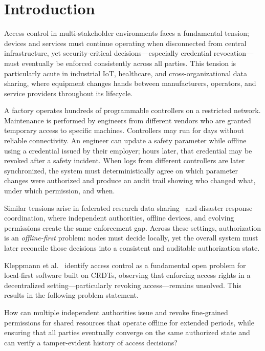 \documentclass[10pt,journal,compsoc]{IEEEtran}
\begin{document}
  
  \section{Introduction}
  \label{sec:intro-paperC}
  Access control in multi-stakeholder environments faces a fundamental tension; devices and services must continue operating when disconnected from central infrastructure, yet security-critical decisions---especially credential revocation---must eventually be enforced consistently across all parties. This tension is particularly acute in industrial IoT\cite{MISTRY2020106382,liu2020fabriciot}, healthcare\cite{HASSELGREN2020104040}, and cross-organizational data sharing\cite{10.1145/3511899,DU2024101878}, where equipment changes hands between manufacturers, operators, and service providers throughout its lifecycle.

  A factory operates hundreds of programmable controllers on a restricted network. Maintenance is performed by engineers from different vendors who are granted temporary access to specific machines. Controllers may run for days without reliable connectivity\cite{9551736,s23208535}. An engineer can update a safety parameter while offline using a credential issued by their employer; hours later, that credential may be revoked after a safety incident. When logs from different controllers are later synchronized, the system must deterministically agree on which parameter changes were authorized and produce an audit trail showing who changed what, under which permission, and when.

  Similar tensions arise in federated research data sharing~\cite{HASSELGREN2020104040,10.1145/3511899} and disaster response coordination, where independent authorities, offline devices, and evolving permissions create the same enforcement gap. Across these settings, authorization is an \emph{offline-first} problem: nodes must decide locally, yet the overall system must later reconcile those decisions into a consistent and auditable authorization state.

Kleppmann et al.~\cite{kleppmann2019localfirst} identify access control as a fundamental open problem for local-first software built on CRDTs, observing that enforcing access rights in a decentralized setting---particularly revoking access---remains unsolved. This results in the following problem statement.

How can multiple independent authorities issue and revoke fine-grained permissions for shared resources that operate offline for extended periods, while ensuring that all parties eventually converge on the same authorized state and can verify a tamper-evident history of access decisions?
\end{document}
